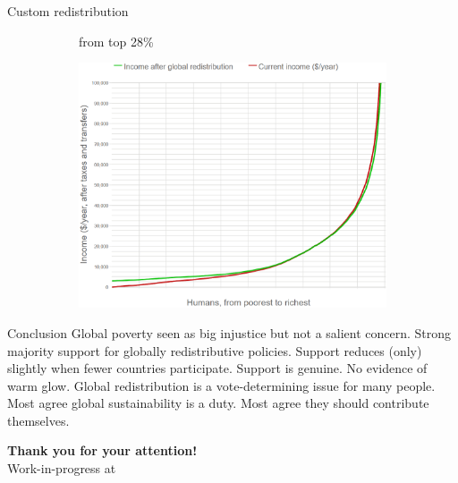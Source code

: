 \documentclass[aspectratio=169,xcolor=dvipsnames, 11pt,mathserif]{beamer}
\begin{document}
\begin{frame}{Custom redistribution \href{run:survey_custom_redistr.mp4}{} \href{https://bit.ly/custom_redistr}{}}
{\begin{figure}
      \begin{subfigure}{.2\textwidth}
        \bbs \ip {}
        \ip {} from top 28\% 
        \ee
      \end{subfigure}\begin{subfigure}{.8\textwidth}
        \includegraphics[height=.8\textheight]{../figures/mean_custom_redistr/all_satisfied.png}
      \end{subfigure}
    \end{figure}}
\end{frame}

\begin{frame}{Conclusion}
\bbsp
\ip Global poverty seen as big injustice but not a salient concern.
\ip Strong majority support for globally redistributive policies.
\ip Support reduces (only) slightly when fewer countries participate.
\ip Support is genuine. No evidence of warm glow.
\ip Global redistribution is a vote-determining issue for many people. %
\ip Most agree global sustainability is a duty.
\ip Most agree they should contribute themselves.
\ip \begin{center} \textbf{Thank you for your attention!} \\   Work-in-progress at  \end{center}
\ee
\end{frame}
\end{document}
